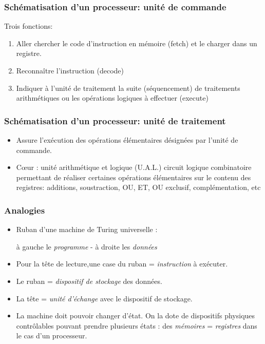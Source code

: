 \begin{frame}
  \frametitle{Schématisation d'un processeur: unité de commande}
 Trois fonctions:
 \begin{enumerate}
  \item Aller chercher le code d'instruction en mémoire (fetch) et le charger dans un registre.
  \item Reconnaître l'instruction (decode)
  \item Indiquer à l'unité de traitement la suite (séquencement) de traitements arithmétiques ou les opérations logiques à effectuer (execute) 
 \end{enumerate}
\end{frame}

\begin{frame}
  \frametitle{Schématisation d'un processeur: unité de traitement}
\begin{itemize}
  \item Assure l'exécution des opérations élémentaires désignées par l'unité de commande.
  \item C\oe{}ur : unité arithmétique et logique (U.A.L.)\newline
  circuit logique combinatoire permettant de réaliser certaines opérations élémentaires sur le contenu des registres: additions, soustraction, OU, ET, OU exclusif, complémentation, etc  
\end{itemize}
\end{frame}


\begin{frame}
\frametitle{Analogies}
\begin{itemize}
  \item Ruban d'une machine de Turing universelle : 
  \begin{center}
à gauche le \emph{programme} -  à droite les \emph{données}    
  \end{center}
  \item Pour la tête de lecture,\newline une case du ruban = \emph{instruction} à exécuter.
  \item Le ruban = \emph{dispositif de stockage} des données.
  \item La tête = \emph{unité d'échange} avec le dispositif de stockage.
  \item La machine doit pouvoir changer d'état. On la dote de dispositifs physiques contrôlables pouvant prendre plusieurs états : des \emph{mémoires} = \emph{registres} dans le cas d'un processeur.
\end{itemize}
\end{frame}

